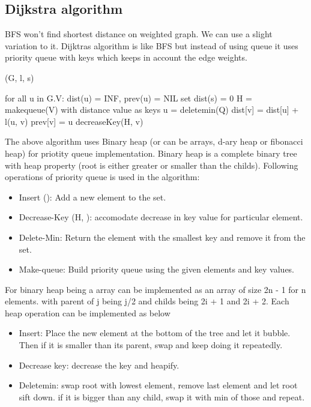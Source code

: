 \documentclass[11pt,letterpaper]{article}
\begin{document}
\subsection{Dijkstra algorithm}
BFS won't find shortest distance on weighted graph. We can use a slight variation to it. Dijktras algorithm is like BFS but instead of using queue it uses priority queue with keys which keeps in account the edge weights. 

\begin{algorithm}
	\caption{ (G, l, s)}
	\begin{algorithmic}[1]
		\State for all u in G.V: dist(u) = INF, prev(u) = NIL
		\State set dist(s) = 0
		\State H = makequeue(V) with distance value as keys
			\State u = deletemin(Q)
					\State dist[v] = dist[u] + l(u, v)
					\State prev[v] = u
					\State decreaseKey(H, v)
				\EndIf
			\EndFor
		\EndWhile
	\end{algorithmic}
\end{algorithm}

The above algorithm uses Binary heap (or can be arrays, d-ary heap or fibonacci heap) for priotity queue implementation. Binary heap is a complete binary tree with heap property  (root is either greater or smaller than the childs). Following operations of priority queue is used in the algorithm:
\begin{itemize}
	\item Insert (): Add a new element to the set. 
	\item Decrease-Key (H, ): accomodate decrease in key value for particular element. 
	\item Delete-Min: Return the element with the smallest key and remove it from the set. 
	\item Make-queue: Build priority queue using the given elements and key values. 
\end{itemize}

For binary heap being a array can be implemented as an array of size 2n - 1 for n elements. with parent of j being j/2 and childs being 2i + 1 and 2i + 2. Each heap operation can be implemented as below

\begin{itemize}
	\item Insert: Place the new element at the bottom of the tree and let it bubble. Then if it is smaller than its parent, swap and keep doing it repeatedly. 
	\item Decrease key: decrease the key and heapify.
	\item Deletemin: swap root with lowest element, remove last element and let root sift down. if it is bigger than any child, swap it with min of those and repeat. 
\end{itemize}
\end{document}
